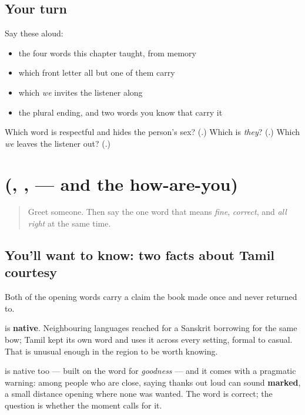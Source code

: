 \subsection*{Your turn}
Say these aloud:

\begin{itemize}
\raggedright
  \item the four words this chapter taught, from memory
  \item which front letter all but one of them carry
  \item which \emph{we} invites the listener along
  \item the plural ending, and two words you know that carry it
\end{itemize}

\begin{tcolorbox}[breakable,colback=teal!4,colframe=teal!35!black,title={Before you move on}]
Which word is respectful and hides the person's sex? (\textbf{}.) Which is \emph{they}? (\textbf{}.) Which \emph{we} leaves the listener out? (\textbf{}.)
\end{tcolorbox}
\section[\texorpdfstring{(\ta{வணக்கம்}, \ta{நன்றி}, \ta{சரி} — and the how-are-you)}{(வணக்கம், நன்றி, சரி — and the how-are-you)}]{(, ,  — and the how-are-you)}

\label{lesson:TA-R85-the-opening-courtesies}



\begin{quote}
Greet someone. Then say the one word that means \emph{fine}, \emph{correct}, and \emph{all right} at the same time.
\end{quote}

\subsection*{You'll want to know: two facts about Tamil courtesy}
Both of the opening words carry a claim the book made once and never returned to.

\textbf{} is \textbf{native}. Neighbouring languages reached for a Sanskrit borrowing for the same bow; Tamil kept its own word and uses it across every setting, formal to casual. That is unusual enough in the region to be worth knowing.

\textbf{} is native too — built on the word for \emph{goodness} — and it comes with a pragmatic warning: among people who are close, saying thanks out loud can sound \textbf{marked}, a small distance opening where none was wanted. The word is correct; the question is whether the moment calls for it.

